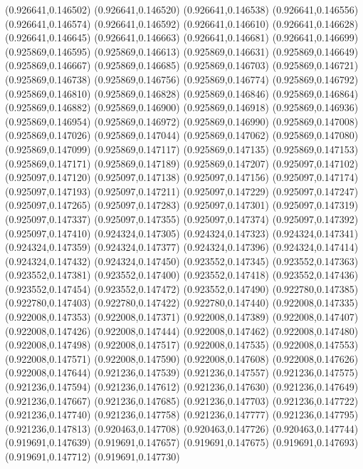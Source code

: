 (0.926641,0.146502)
(0.926641,0.146520)
(0.926641,0.146538)
(0.926641,0.146556)
(0.926641,0.146574)
(0.926641,0.146592)
(0.926641,0.146610)
(0.926641,0.146628)
(0.926641,0.146645)
(0.926641,0.146663)
(0.926641,0.146681)
(0.926641,0.146699)
(0.925869,0.146595)
(0.925869,0.146613)
(0.925869,0.146631)
(0.925869,0.146649)
(0.925869,0.146667)
(0.925869,0.146685)
(0.925869,0.146703)
(0.925869,0.146721)
(0.925869,0.146738)
(0.925869,0.146756)
(0.925869,0.146774)
(0.925869,0.146792)
(0.925869,0.146810)
(0.925869,0.146828)
(0.925869,0.146846)
(0.925869,0.146864)
(0.925869,0.146882)
(0.925869,0.146900)
(0.925869,0.146918)
(0.925869,0.146936)
(0.925869,0.146954)
(0.925869,0.146972)
(0.925869,0.146990)
(0.925869,0.147008)
(0.925869,0.147026)
(0.925869,0.147044)
(0.925869,0.147062)
(0.925869,0.147080)
(0.925869,0.147099)
(0.925869,0.147117)
(0.925869,0.147135)
(0.925869,0.147153)
(0.925869,0.147171)
(0.925869,0.147189)
(0.925869,0.147207)
(0.925097,0.147102)
(0.925097,0.147120)
(0.925097,0.147138)
(0.925097,0.147156)
(0.925097,0.147174)
(0.925097,0.147193)
(0.925097,0.147211)
(0.925097,0.147229)
(0.925097,0.147247)
(0.925097,0.147265)
(0.925097,0.147283)
(0.925097,0.147301)
(0.925097,0.147319)
(0.925097,0.147337)
(0.925097,0.147355)
(0.925097,0.147374)
(0.925097,0.147392)
(0.925097,0.147410)
(0.924324,0.147305)
(0.924324,0.147323)
(0.924324,0.147341)
(0.924324,0.147359)
(0.924324,0.147377)
(0.924324,0.147396)
(0.924324,0.147414)
(0.924324,0.147432)
(0.924324,0.147450)
(0.923552,0.147345)
(0.923552,0.147363)
(0.923552,0.147381)
(0.923552,0.147400)
(0.923552,0.147418)
(0.923552,0.147436)
(0.923552,0.147454)
(0.923552,0.147472)
(0.923552,0.147490)
(0.922780,0.147385)
(0.922780,0.147403)
(0.922780,0.147422)
(0.922780,0.147440)
(0.922008,0.147335)
(0.922008,0.147353)
(0.922008,0.147371)
(0.922008,0.147389)
(0.922008,0.147407)
(0.922008,0.147426)
(0.922008,0.147444)
(0.922008,0.147462)
(0.922008,0.147480)
(0.922008,0.147498)
(0.922008,0.147517)
(0.922008,0.147535)
(0.922008,0.147553)
(0.922008,0.147571)
(0.922008,0.147590)
(0.922008,0.147608)
(0.922008,0.147626)
(0.922008,0.147644)
(0.921236,0.147539)
(0.921236,0.147557)
(0.921236,0.147575)
(0.921236,0.147594)
(0.921236,0.147612)
(0.921236,0.147630)
(0.921236,0.147649)
(0.921236,0.147667)
(0.921236,0.147685)
(0.921236,0.147703)
(0.921236,0.147722)
(0.921236,0.147740)
(0.921236,0.147758)
(0.921236,0.147777)
(0.921236,0.147795)
(0.921236,0.147813)
(0.920463,0.147708)
(0.920463,0.147726)
(0.920463,0.147744)
(0.919691,0.147639)
(0.919691,0.147657)
(0.919691,0.147675)
(0.919691,0.147693)
(0.919691,0.147712)
(0.919691,0.147730)
